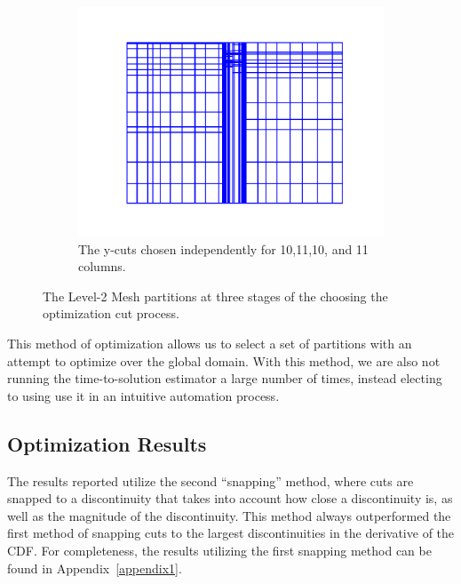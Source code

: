 \documentclass[times,final]{elsarticle}
\begin{document}
\begin{figure}[h]
\begin{subfigure}[b]{\textwidth}
\includegraphics[scale=0.5]{../figures/lvl2_suite_2.pdf}
    \caption{The y-cuts chosen independently for 10,11,10, and 11 columns.}
    \label{10}
  \end{subfigure}
  \caption{The Level-2 Mesh partitions at three stages of the choosing the optimization cut process.}
  \label{opt_walkthrough}
\end{figure}

This method of optimization allows us to select a set of partitions with an attempt to optimize over the global domain.
With this method, we are also not running the time-to-solution estimator a large number of times, instead electing to using use it in an intuitive automation process.

\FloatBarrier

\subsection{Optimization Results}

The results reported utilize the second ``snapping'' method, where cuts are snapped to a discontinuity that takes into account how close a discontinuity is, as well as the magnitude of the discontinuity.
This method always outperformed the first method of snapping cuts to the largest discontinuities in the derivative of the CDF.
For completeness, the results utilizing the first snapping method can be found in Appendix~\ref{appendix1}.
\end{document}
